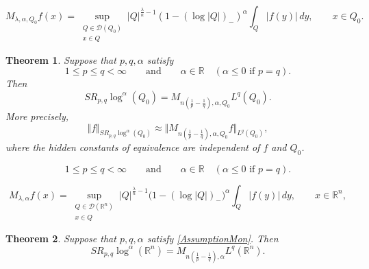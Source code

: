 \documentclass[10pt,a4paper]{amsart}
\newtheorem{theorem}{Theorem}
\begin{document}
\begin{equation}
M_{\lambda,\alpha,Q_{0}}f(x)=\sup_{\substack{Q\in\mathcal{D}(Q_{0})\\x\in
Q}} |Q|^{\frac{\lambda}{n}-1}  (1-(\log|Q|)_{-})^{\alpha}\int_{Q}|f(y)| \,dy,\qquad x\in Q_{0}%
.\label{maxlam}%
\end{equation}

\begin{theorem}
\label{ThmSparseRieszMaximal} Suppose that $p,q,\alpha$ satisfy
\begin{equation}
1\leq p\leq q<\infty\qquad\text{and}\qquad\alpha\in\mathbb{R}\quad(\alpha
\leq0\text{ if }p=q). \label{AssumptionMon}%
\end{equation}
Then 
\[
SR_{p,q}\log^{\alpha}(Q_{0})=M_{n(\frac{1}{p}-\frac{1}{q}),\alpha,Q_{0}}%
L^{q}(Q_{0}).
\]
More precisely,
\begin{equation*}
\Vert f\Vert_{SR_{p,q}\log^{\alpha}(Q_{0})}\approx\Vert M_{n(\frac{1}{p}%
-\frac{1}{q}),\alpha,Q_{0}}f\Vert_{L^{q}(Q_{0})},
\end{equation*}
where the hidden constants of equivalence are independent of $f$ and $Q_{0}$.
\end{theorem}

\begin{equation}
1\leq p\leq q<\infty\qquad\text{and}\qquad\alpha\in\mathbb{R}\quad(\alpha
\leq0\text{ if }p=q). %
\end{equation}

\begin{equation}
M_{\lambda,\alpha}f(x)=\sup_{\substack{Q\in\mathcal{D}(\mathbb{R}^{n})\\x\in
Q}}|Q|^{\frac{\lambda}{n}-1}\big(1-(\log|Q|)_{-}\big)^{\alpha}\int%
_{Q}|f(y)|\,dy,\qquad x\in\mathbb{R}^{n}, \label{maxlamRn}%
\end{equation}

\begin{theorem}
\label{ThmSparseRieszMaximalRn} Suppose that $p,q, \alpha$ satisfy \eqref{AssumptionMon}.  Then
\[
SR_{p,q}\log^{\alpha}(\mathbb{R}^{n})=M_{n(\frac{1}{p}-\frac{1}{q}),\alpha
}L^{q}(\mathbb{R}^{n}).
\]

\end{theorem}
\end{document}

